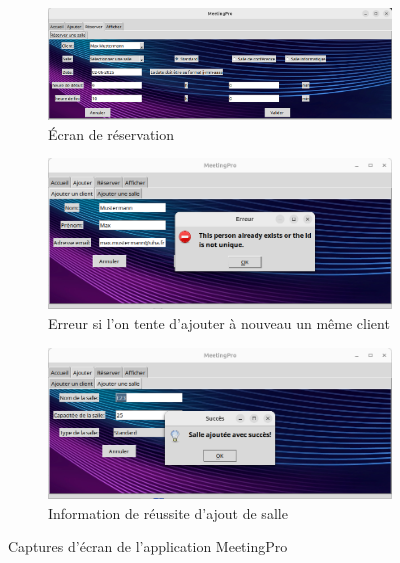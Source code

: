 \documentclass[a4paper,12pt]{article}
\begin{document}
\begin{figure}[H]
    \centering
    \begin{subfigure}{0.8\textwidth}
        \includegraphics[width=\textwidth]{screenshot1.jpg}
        \caption{Écran de réservation}
    \end{subfigure}
    \hfill
    \begin{subfigure}{0.8\textwidth}
        \includegraphics[width=\textwidth]{screenshot2.jpg}
        \caption{Erreur si l'on tente d'ajouter à nouveau un même client}
    \end{subfigure}
    \hfill
    \begin{subfigure}{0.8\textwidth}
        \includegraphics[width=\textwidth]{screenshot3.jpg}
        \caption{Information de réussite d'ajout de salle}
    \end{subfigure}
    \caption{Captures d'écran de l'application MeetingPro}
\end{figure}
\end{document}
